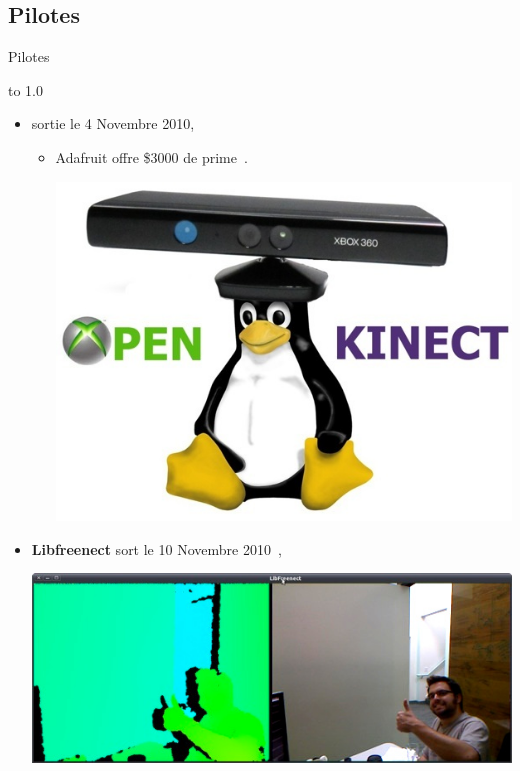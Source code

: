 \subsection{Pilotes}
\begin{frame}{Pilotes}

\vbox to 1.0\textheight
{
  \begin{itemize}
  \item sortie le 4 Novembre 2010,
  \begin{itemize}
  \item Adafruit offre \$3000 de prime~\cite{adafruit_bounty}.
  
  {
  \vfill
  \begin{center}
  \includegraphics[width=0.65\textheight]{../images/kinect_tux}
  \end{center}
  }
  
  \end{itemize}
    \item<2-> \textbf{Libfreenect} sort le 10 Novembre 2010~\cite{adafruit_winner},
    
    {
    \vfill
    \begin{center}
    \includegraphics[width=0.9\linewidth]{../images/hector}
    \end{center}
    }
    

\end{itemize}}
\end{frame}

